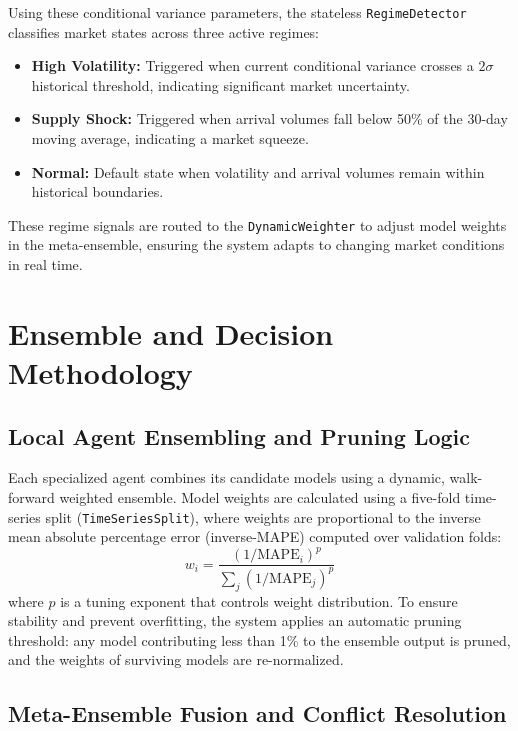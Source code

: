 \documentclass[12pt,a4paper]{report}
\theoremstyle{definition}
\theoremstyle{remark}
\begin{document}
Using these conditional variance parameters, the stateless \texttt{RegimeDetector} classifies market states across three active regimes:
\begin{itemize}
    \item \textbf{High Volatility:} Triggered when current conditional variance crosses a $2\sigma$ historical threshold, indicating significant market uncertainty.
    \item \textbf{Supply Shock:} Triggered when arrival volumes fall below 50\% of the 30-day moving average, indicating a market squeeze.
    \item \textbf{Normal:} Default state when volatility and arrival volumes remain within historical boundaries.
\end{itemize}

These regime signals are routed to the \texttt{DynamicWeighter} to adjust model weights in the meta-ensemble, ensuring the system adapts to changing market conditions in real time.

\section{Ensemble and Decision Methodology}

\subsection{Local Agent Ensembling and Pruning Logic}

Each specialized agent combines its candidate models using a dynamic, walk-forward weighted ensemble. Model weights are calculated using a five-fold time-series split (\texttt{TimeSeriesSplit}), where weights are proportional to the inverse mean absolute percentage error (inverse-MAPE) computed over validation folds:
\begin{equation}
    w_i = \frac{(1 / \text{MAPE}_i)^p}{\sum_j (1 / \text{MAPE}_j)^p}
\end{equation}
where $p$ is a tuning exponent that controls weight distribution. To ensure stability and prevent overfitting, the system applies an automatic pruning threshold: any model contributing less than 1\% to the ensemble output is pruned, and the weights of surviving models are re-normalized.

\subsection{Meta-Ensemble Fusion and Conflict Resolution}
\end{document}
